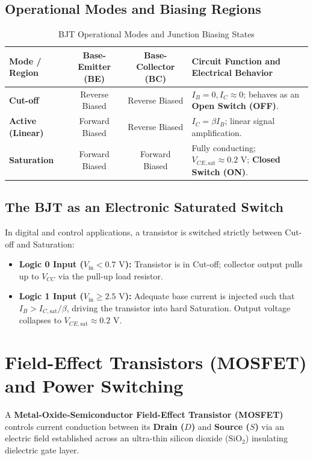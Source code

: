 \subsection{Operational Modes and Biasing Regions}
\begin{table}[htbp]
\centering
\small
\caption{BJT Operational Modes and Junction Biasing States}
\label{tab:bjt_modes}
\begin{tabularx}{\textwidth}{l c c X}
\toprule
\textbf{Mode / Region} & \textbf{Base-Emitter (BE)} & \textbf{Base-Collector (BC)} & \textbf{Circuit Function and Electrical Behavior} \\
\midrule
\textbf{Cut-off} & Reverse Biased & Reverse Biased & $I_B = 0, I_C \approx 0$; behaves as an \textbf{Open Switch (OFF)}. \\
\textbf{Active (Linear)} & Forward Biased & Reverse Biased & $I_C = \beta I_B$; linear signal amplification. \\
\textbf{Saturation} & Forward Biased & Forward Biased & Fully conducting; $V_{CE,\text{sat}} \approx 0.2\text{ V}$; \textbf{Closed Switch (ON)}. \\
\bottomrule
\end{tabularx}
\end{table}

\subsection{The BJT as an Electronic Saturated Switch}
In digital and control applications, a transistor is switched strictly between Cut-off and Saturation:
\begin{itemize}
    \item \textbf{Logic 0 Input ($V_{\text{in}} < 0.7\text{ V}$):} Transistor is in Cut-off; collector output pulls up to $V_{CC}$ via the pull-up load resistor.
    \item \textbf{Logic 1 Input ($V_{\text{in}} \ge 2.5\text{ V}$):} Adequate base current is injected such that $I_B > I_{C,\text{sat}} / \beta$, driving the transistor into hard Saturation. Output voltage collapses to $V_{CE,\text{sat}} \approx 0.2\text{ V}$.
\end{itemize}


\section{Field-Effect Transistors (MOSFET) and Power Switching}
\label{sec:mosfets}

A \textbf{Metal-Oxide-Semiconductor Field-Effect Transistor (MOSFET)} controls current conduction between its \textbf{Drain ($D$)} and \textbf{Source ($S$)} via an electric field established across an ultra-thin silicon dioxide ($\text{SiO}_2$) insulating dielectric gate layer.

